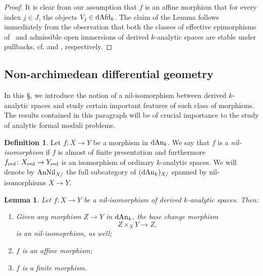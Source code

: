 \documentclass[10pt,a4paper,reqno]{amsart} %
\theoremstyle{plain}
\newtheorem{lem}[thm]{Lemma}
\theoremstyle{definition}
\newtheorem{defin}[thm]{Definition}
\theoremstyle{remark}
\numberwithin{equation}{section}
\begin{document}
\begin{proof} It is clear from our assumption that $f$ is an affine morphism that for every index $j \in J$, the objects $V_j \in \mathrm{dAfd}_k$. The claim of the Lemma
    follows immediately from the observation that
    both the classes of effective epimorphisms of \inftopoi \ and admissible open immersions of derived $k$-analytic spaces are stable under pullbacks,
    cf. \cite[Proposition 6.2.3.15]{HTT} and \cite[Corollary 5.11, Proposition 5.12]{Porta_Yu_Representability}, respectively.
\end{proof}


\subsection{Non-archimedean differential geometry} In this \S, we introduce the notion of a nil-isomorphism between derived
$k$-analytic spaces and study certain important features of such class of morphisms. The results contained in this paragraph will be of
crucial importance to the study of analytic formal moduli problems.

\begin{defin}
    Let $f \colon X \to Y$ be a morphism in $\mathrm{dAn}_k$. We say that $f$ is a \emph{nil-isomorphism} if $f$ is almost of finite presentation
    and furthermore
    $f_{\mathrm{red}} \colon X_{\mathrm{red}} \to
    Y_{\mathrm{red}}$ is an isomorphism of ordinary $k$-analytic spaces. 
    We will denote by $\mathrm{AnNil}_{X/ }$ the full subcategory of $(\mathrm{dAn}_k)_{X/}$
    spanned by nil-isomorphisms $X \to Y$.
\end{defin}

\begin{lem} \label{lem:nil-isos_are_affine_morphisms}
    Let $f \colon X \to Y$ be a nil-isomorphism of derived $k$-analytic spaces. Then:
    \begin{enumerate}
        \item Given any morphism $Z \to Y$ in $\mathrm{dAn}_k$, the base change morphism
            \[
                Z \times_X Y \to Z,  
            \]
        is an nil-isomoprhism, as well;
        \item $f$ is an affine morphism;
        \item $f$ is a finite morphism.
    \end{enumerate}
\end{lem}
\end{document}
